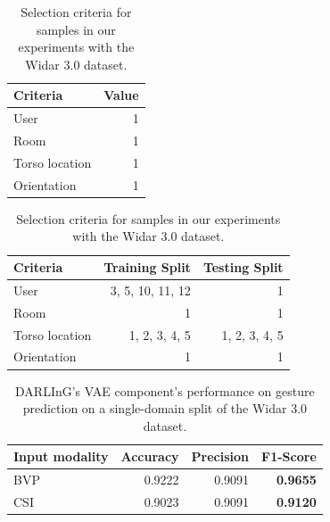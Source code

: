 \begin{table}[t]
	\centering
	\begin{subtable}{0.3\textwidth}
		\centering
		\begin{tabular}{@{}lr@{}}
			\toprule
			Criteria       & Value \\ \midrule
			User           & 1     \\
			Room           & 1     \\
			Torso location & 1     \\
			Orientation    & 1     \\ \bottomrule
		\end{tabular}
		\caption{Single-domain split criteria.}
		\label{tab:single-domain-select}
	\end{subtable}
	\hfill
	\begin{subtable}{0.68\textwidth}
		\centering
		\begin{tabular}{@{}lrr@{}}
			\toprule
			Criteria       & Training Split      & Testing Split \\ \midrule
			User           & 3, 5, 10, 11, 12    & 1             \\
			Room           & 1                   & 1             \\
			Torso location & 1, 2, 3, 4, 5       & 1, 2, 3, 4, 5 \\
			Orientation    & 1                   & 1             \\ \bottomrule
		\end{tabular}
		\caption{Single user leave out criteria.}
		\label{tab:single-user-select}
	\end{subtable}
	\caption{Selection criteria for samples in our experiments with the Widar 3.0 dataset.}

\end{table}

\begin{table}[b]
	\centering
	\begin{tabular}{@{}lrrr@{}}
		\toprule
		Input modality     & Accuracy & Precision & F1-Score        \\ \midrule
		BVP                & 0.9222   & 0.9091    & \textbf{0.9655} \\
		CSI                & 0.9023   & 0.9091    & \textbf{0.9120} \\ \bottomrule
	\end{tabular}
	\caption{DARLInG's VAE component's performance on gesture prediction on a single-domain split of the Widar 3.0 dataset.}
	\label{tab:single-domain-performance}
\end{table}

